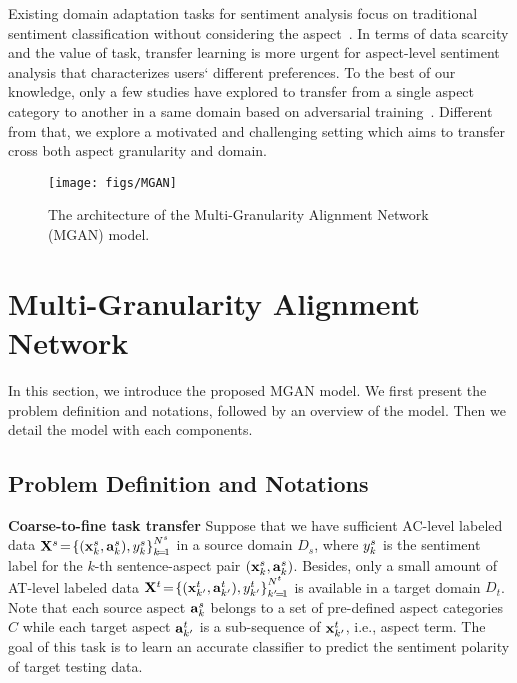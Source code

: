 \documentclass[letterpaper]{article} \usepackage{aaai19}  \usepackage{times}  \usepackage{latexsym}
\begin{document}
Existing domain adaptation tasks for sentiment analysis focus on traditional sentiment classification without considering the aspect~\cite{blitzer2007biographies,pan2010cross,glorot2011domain,chen2012marginalized,bollegala2013cross,yu2016learning,li2017end,li2018hatn}. In terms of data scarcity and the value of task, transfer learning is more urgent for aspect-level sentiment analysis that characterizes users` different preferences. To the best of our knowledge, only a few studies have explored to transfer from a single aspect category to another in a same domain based on adversarial training~\cite{zhang2017aspect}. Different from that, we explore a motivated and challenging setting which aims to transfer cross both aspect granularity and domain. 


\begin{figure*}[thb!]
\centering
\texttt{[image: figs/MGAN]}
\vspace{-3mm}
\caption{The architecture of the Multi-Granularity Alignment Network (MGAN) model.}
\vspace{-4mm}
\label{fig:overall}
\end{figure*}

\section{Multi-Granularity Alignment Network} 
In this section, we introduce the proposed MGAN model. We first present the problem definition and notations, followed by an overview of the model. Then we detail the model with each components.

\vspace{-0.5mm}
\subsection{Problem Definition and Notations}
\noindent \textbf{Coarse-to-fine task transfer}
Suppose that we have sufficient AC-level labeled data $\small{{ \mathbf{X} }^{ s }\!=\!{ \{ ({ \mathbf{x} }_{k }^{ s },{ { \mathbf{a} } }_{ k }^{ s }),{ y }_{ k }^{ s } \}  }_{ k\!=\!1 }^{ { N }^{ s } }}$ in a source domain $D_{s}$, where $\small{y^s_k}$ is the sentiment  label for the $k$-th sentence-aspect pair  $(\small{\mathbf{x}_k^s},\small{\mathbf{a}_k^s})$. Besides, only a small amount of AT-level labeled data $\small{{ \mathbf{X} }^{ t }\!=\!{ \{ ({ \mathbf{x} }_{ k' }^{ t },{ { \mathbf{a} } }_{ k' }^{ t }),{ y }_{ k' }^{ t } \}  }_{ k'\!=\!1 }^{ { N }^{ t } }}$ is available in a target domain $D_{t}$. Note that each source aspect $\small{\mathbf{a}^s_{k}}$ belongs to a set of pre-defined aspect categories $C$ while each target aspect $\small{\mathbf{a}^t_{k'}}$ is a sub-sequence of $\small{\mathbf{x}^t_{k'}}$, i.e., aspect term. The goal of this task is to learn an accurate classifier to predict the sentiment polarity of target testing data. 
\end{document}
